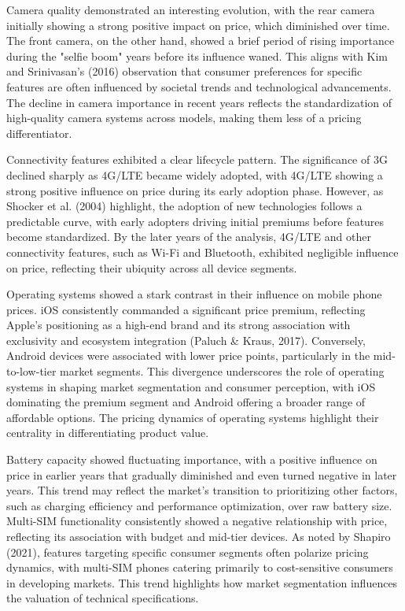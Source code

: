 \documentclass[12pt]{article}
\begin{document}
Camera quality demonstrated an interesting evolution, with the rear camera initially showing a strong positive impact on price, which diminished over time. The front camera, on the other hand, showed a brief period of rising importance during the "selfie boom" years before its influence waned. This aligns with Kim and Srinivasan’s (2016) observation that consumer preferences for specific features are often influenced by societal trends and technological advancements. The decline in camera importance in recent years reflects the standardization of high-quality camera systems across models, making them less of a pricing differentiator.

Connectivity features exhibited a clear lifecycle pattern. The significance of 3G declined sharply as 4G/LTE became widely adopted, with 4G/LTE showing a strong positive influence on price during its early adoption phase. However, as Shocker et al. (2004) highlight, the adoption of new technologies follows a predictable curve, with early adopters driving initial premiums before features become standardized. By the later years of the analysis, 4G/LTE and other connectivity features, such as Wi-Fi and Bluetooth, exhibited negligible influence on price, reflecting their ubiquity across all device segments.

Operating systems showed a stark contrast in their influence on mobile phone prices. iOS consistently commanded a significant price premium, reflecting Apple’s positioning as a high-end brand and its strong association with exclusivity and ecosystem integration (Paluch \& Kraus, 2017). Conversely, Android devices were associated with lower price points, particularly in the mid-to-low-tier market segments. This divergence underscores the role of operating systems in shaping market segmentation and consumer perception, with iOS dominating the premium segment and Android offering a broader range of affordable options. The pricing dynamics of operating systems highlight their centrality in differentiating product value.

Battery capacity showed fluctuating importance, with a positive influence on price in earlier years that gradually diminished and even turned negative in later years. This trend may reflect the market's transition to prioritizing other factors, such as charging efficiency and performance optimization, over raw battery size. 
Multi-SIM functionality consistently showed a negative relationship with price, reflecting its association with budget and mid-tier devices. As noted by Shapiro (2021), features targeting specific consumer segments often polarize pricing dynamics, with multi-SIM phones catering primarily to cost-sensitive consumers in developing markets. This trend highlights how market segmentation influences the valuation of technical specifications.
\end{document}
